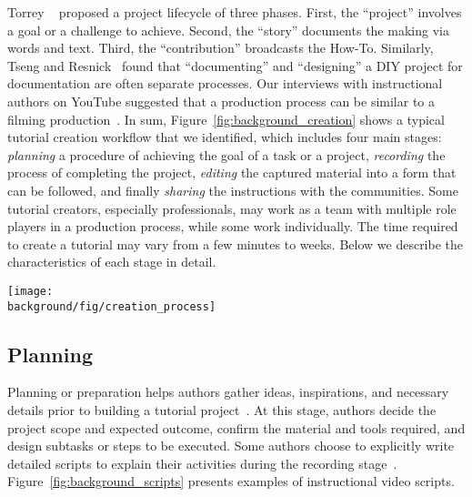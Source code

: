 Torrey \ea{}~\cite{Torrey:2007he} proposed a project lifecycle of three phases. First, the ``project'' involves a goal or a challenge to achieve. Second, the ``story'' documents the making via words and text. Third, the ``contribution'' broadcasts the How-To.
%
Similarly, Tseng and Resnick~\cite{Tseng:2014:PVP:2598510.2598540} found that ``documenting'' and ``designing'' a DIY project for documentation are often separate processes.
%
Our interviews with instructional authors on YouTube suggested that a production process can be similar to a filming production~\cite{Chi:2013:DGC:2501988.2502052,pincus2012the}.
%
In sum, Figure~\ref{fig:background_creation} shows a typical tutorial creation workflow that we identified, which includes four main stages: \emph{planning} a procedure of achieving the goal of a task or a project, \emph{recording} the process of completing the project, \emph{editing} the captured material into a form that can be followed, and finally \emph{sharing} the instructions with the communities.
%
Some tutorial creators, especially professionals, may work as a team with multiple role players in a production process, while some work individually. The time required to create a tutorial may vary from a few minutes to weeks.
%
Below we describe the characteristics of each stage in detail.

\begin{figure*}[!t]
  \centering
  \texttt{[image: \\background/fig/creation\_process]}
  \caption{A common workflow of tutorial creation, which includes planning the task in detail, recording the process, editing the captured content into a readable form, and sharing with the communities.}
  \label{fig:background_creation}
\end{figure*}


\subsection{Planning}
Planning or preparation helps authors gather ideas, inspirations, and necessary details prior to building a tutorial project~\cite{Torrey:2007he}. At this stage, authors decide the project scope and expected outcome, confirm the material and tools required, and design subtasks or steps to be executed. Some authors choose to explicitly write detailed scripts to explain their activities during the recording stage~\cite{Chi:2013:DGC:2501988.2502052}. Figure~\ref{fig:background_scripts} presents examples of instructional video scripts.

